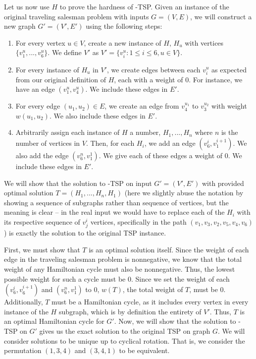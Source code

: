 Let us now use $H$ to prove the hardness of \inob{}-TSP. 
Given an instance of the original traveling salesman problem with inputs $G = (V,E)$, we will construct a new graph $G' = (V', E')$ using the following steps:
\begin{enumerate}
    \item For every vertex $u \in V$, create a new instance of $H$, $H_u$ with vertices $\{v_1^{u}, ..., v_6^{u}\}$. We define $V'$ as $V' = \{v_i^u : 1 \leq i \leq 6, u \in V\}$.
    \item For every instance of $H_u$ in $V'$, we create edges between each $v_i^u$ as expected from our original definition of $H$, each with a weight of $0$. For instance, we have an edge $(v_1^u, v_4^u)$. We include these edges in $E'$. 
    \item For every edge $(u_1,u_2) \in E$, we create an edge from $v^{u_1}_4$ to $v^{u_2}_3$ with weight $w(u_1,u_2)$. We also include these edges in $E'$.
    \item Arbitrarily assign each instance of $H$ a number, $H_1,..., H_n$ where $n$ is the number of vertices in $V$. Then, for each $H_i$, we add an edge $(v_6^i,v_1^{i+1})$. We also add the edge $(v_6^n, v_1^1)$. We give each of these edges a weight of $0$. We include these edges in $E'$.
\end{enumerate}

We will show that the solution to \inob{}-TSP on input $G' = (V', E')$ with provided optimal solution $T = (H_1, ..., H_n, H_1)$ (here we slightly abuse the notation by showing a sequence of subgraphs rather than sequence of vertices, but the meaning is clear -- in the real input we would have to replace each of the $H_i$ with its respective sequence of $v_j^i$ vertices, specifically in the path $(v_1, v_3, v_2, v_5, v_4, v_6)$) is exactly the solution to the original TSP instance.

First, we must show that $T$ is an optimal solution itself. Since the weight of each edge in the traveling salesman problem is nonnegative, we know that the total weight of any Hamiltonian cycle must also be nonnegative. Thus, the lowest possible weight for such a cycle must be $0$. Since we set the weight of each $(v_6^i,v_6^{i+1})$ and $(v_6^n, v_1^1)$ to $0$, $w(T)$, the total weight of $T$, must be $0$. Additionally, $T$ must be a Hamiltonian cycle, as it includes every vertex in every instance of the $H$ subgraph, which is by definition the entirety of $V'$. Thus, $T$ is an optimal Hamiltonian cycle for $G'$. Now, we will show that the solution to \inob{}-TSP on $G'$ gives us the exact solution to the original TSP on graph $G$. We will consider solutions to be unique up to cyclical rotation. That is, we consider the permutation $(1,3,4)$ and $(3,4,1)$ to be equivalent.

